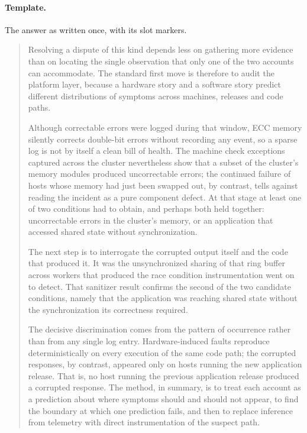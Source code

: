 \paragraph{Template.} The answer as written once, with its slot markers.

\begin{quote}\small
Resolving a dispute of this kind depends less on gathering more evidence than on locating the single observation that only one of the two accounts can accommodate. The standard first move is therefore to audit the platform layer, because a hardware story and a software story predict different distributions of symptoms across machines, releases and code paths. 

 Although correctable errors were logged during that window, ECC memory silently corrects double-bit errors without recording any event, so a sparse log is not by itself a clean bill of health. The machine check exceptions captured across the cluster nevertheless show that a subset of the cluster's memory modules produced uncorrectable errors; the continued failure of hosts whose memory had just been swapped out, by contrast, tells against reading the incident as a pure component defect. At that stage at least one of two conditions had to obtain, and perhaps both held together: uncorrectable errors in the cluster's memory, or an application that accessed shared state without synchronization.

The next step is to interrogate the corrupted output itself and the code that produced it.  It was the unsynchronized sharing of that ring buffer across workers that produced the race condition instrumentation went on to detect.  That sanitizer result confirms the second of the two candidate conditions, namely that the application was reaching shared state without the synchronization its correctness required.

The decisive discrimination comes from the pattern of occurrence rather than from any single log entry. Hardware-induced faults reproduce deterministically on every execution of the same code path; the corrupted responses, by contrast, appeared only on hosts running the new application release. That is, no host running the previous application release produced a corrupted response. The method, in summary, is to treat each account as a prediction about where symptoms should and should not appear, to find the boundary at which one prediction fails, and then to replace inference from telemetry with direct instrumentation of the suspect path.
\end{quote}

